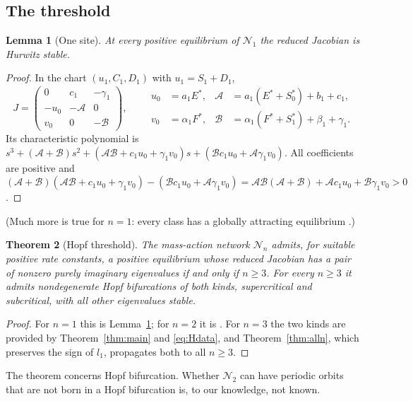 \documentclass[11pt,a4paper]{article}
\theoremstyle{plain}
\newtheorem{theorem}{Theorem}[section]
\newtheorem{lemma}[theorem]{Lemma}
\theoremstyle{definition}
\theoremstyle{remark}
\newcommand{\cN}{\mathcal N}
\begin{document}
\subsection{The threshold}
\begin{lemma}[One site]\label{lem:onesite}
At every positive equilibrium of $\cN_1$ the reduced Jacobian is Hurwitz stable.
\end{lemma}
\begin{proof}
In the chart $(u_1,C_1,D_1)$ with $u_1=S_1+D_1$,
\[
 J=\begin{pmatrix}0&c_1&-\gamma_1\\-u_0&-\mathcal A&0\\ v_0&0&-\mathcal B\end{pmatrix},\qquad
 \begin{aligned} u_0&=a_1E^*,& \mathcal A&=a_1(E^*+S_0^*)+b_1+c_1,\\ v_0&=\alpha_1F^*,& \mathcal B&=\alpha_1(F^*+S_1^*)+\beta_1+\gamma_1 .\end{aligned}
\]
Its characteristic polynomial is $s^3+(\mathcal A+\mathcal B)s^2+(\mathcal A\mathcal B+c_1u_0+\gamma_1v_0)s+(\mathcal Bc_1u_0+\mathcal A\gamma_1v_0)$. All coefficients are positive and $(\mathcal A+\mathcal B)(\mathcal A\mathcal B+c_1u_0+\gamma_1v_0)-(\mathcal Bc_1u_0+\mathcal A\gamma_1v_0)=\mathcal A\mathcal B(\mathcal A+\mathcal B)+\mathcal Ac_1u_0+\mathcal B\gamma_1v_0>0$.
\end{proof}
(Much more is true for $n=1$: every class has a globally attracting equilibrium \cite{AngeliSontag08}.)

\begin{theorem}[Hopf threshold]\label{thm:threshold}
The mass-action network $\cN_n$ admits, for suitable positive rate constants, a positive equilibrium whose reduced Jacobian has a pair of nonzero purely imaginary eigenvalues if and only if $n\ge3$. For every $n\ge3$ it admits nondegenerate Hopf bifurcations of both kinds, supercritical and subcritical, with all other eigenvalues stable.
\end{theorem}
\begin{proof}
For $n=1$ this is Lemma~\ref{lem:onesite}; for $n=2$ it is \cite[Theorem~5.8]{Vassena26}. For $n=3$ the two kinds are provided by Theorem~\ref{thm:main} and \eqref{eq:Hdata}, and Theorem~\ref{thm:alln}, which preserves the sign of $l_1$, propagates both to all $n\ge3$.
\end{proof}
The theorem concerns Hopf bifurcation. Whether $\cN_2$ can have periodic orbits that are not born in a Hopf bifurcation is, to our knowledge, not known.
\end{document}
